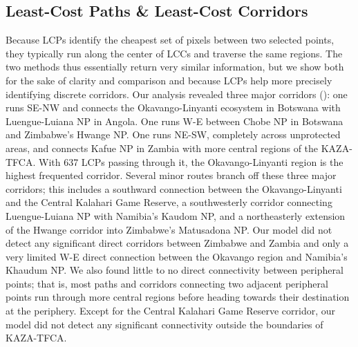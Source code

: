 \documentclass[abstract=on,10pt,a4paper,bibliography=totocnumbered]{scrartcl}
\begin{document}
\subsection{Least-Cost Paths \& Least-Cost Corridors}
Because LCPs identify the cheapest set of pixels between two selected points,
they typically run along the center of LCCs and traverse the same regions. The
two methods thus essentially return very similar information, but we show both
for the sake of clarity and comparison and because LCPs help more precisely
identifying discrete corridors. Our analysis revealed three major corridors
(): one runs SE-NW and connects the Okavango-Linyanti ecosystem
in Botswana with Luengue-Luiana NP in Angola. One runs W-E between Chobe NP in
Botswana and Zimbabwe’s Hwange NP. One runs NE-SW, completely across unprotected
areas, and connects Kafue NP in Zambia with more central regions of the
KAZA-TFCA. With 637 LCPs passing through it, the Okavango-Linyanti region is the
highest frequented corridor. Several minor routes branch off these three major
corridors; this includes a southward connection between the Okavango-Linyanti
and the Central Kalahari Game Reserve, a southwesterly corridor connecting
Luengue-Luiana NP with Namibia’s Kaudom NP, and a northeasterly extension of the
Hwange corridor into Zimbabwe’s Matusadona NP. Our model did not detect any
significant direct corridors between Zimbabwe and Zambia and only a very limited
W-E direct connection between the Okavango region and Namibia’s Khaudum NP. We
also found little to no direct connectivity between peripheral points; that is,
most paths and corridors connecting two adjacent peripheral points run through
more central regions before heading towards their destination at the periphery.
Except for the Central Kalahari Game Reserve corridor, our model did not detect
any significant connectivity outside the boundaries of KAZA-TFCA.
\end{document}
